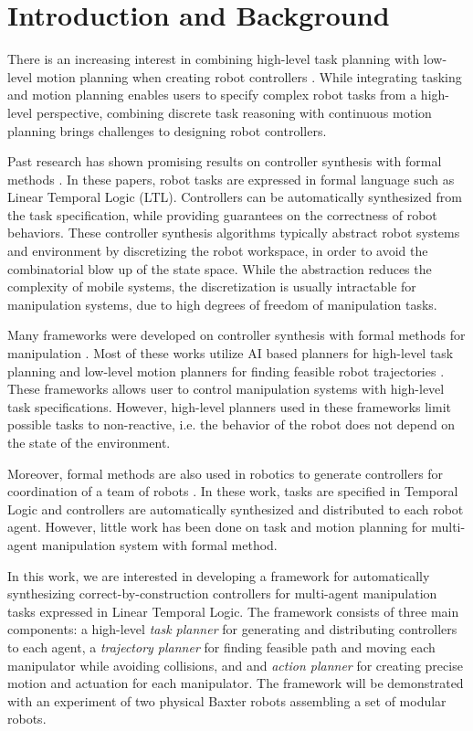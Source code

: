 \section{Introduction and Background}
There is an increasing interest in combining high-level task planning
with low-level motion planning when creating robot controllers \cite{HKG2009,Belta2008,Bhatia2011,Dornhege2009,Erdem2011,Tom2014,Srivastava2014}.
While integrating tasking and motion planning enables users to specify complex robot tasks from a high-level perspective,
combining discrete task reasoning with continuous motion planning brings challenges to designing robot controllers.

Past research has shown promising results on controller synthesis with formal methods \cite{HKG2009,Belta2008,Bhatia2011,Wongpiromsarn,Maly,Vasile}.
In these papers, robot tasks are expressed in formal language such as Linear Temporal Logic (LTL).
Controllers can be automatically synthesized from the task specification,
while providing guarantees on the correctness of robot behaviors.
These controller synthesis algorithms typically abstract robot systems and environment by discretizing the robot workspace,
in order to avoid the combinatorial blow up of the state space.
While the abstraction reduces the complexity of mobile systems,
the discretization is usually intractable for manipulation systems,
due to high degrees of freedom of manipulation tasks.

Many frameworks were developed on controller synthesis with formal methods for manipulation \cite{Dornhege2009,Erdem2011,Tom2014,Srivastava2014,CambonAG09,KaelblingL11,PlakuH10,HeLKV15}.
Most of these works utilize AI based planners for high-level task planning and low-level motion planners for finding feasible robot trajectories \cite{Nau,Hoffmann01}.
These frameworks allows user to control manipulation systems with high-level task specifications.
However, high-level planners used in these frameworks limit possible tasks to non-reactive,
i.e. the behavior of the robot does not depend on the state of the environment.

Moreover, formal methods are also used in robotics to generate controllers for coordination of a team of robots \cite{ChenDSB12,KaramanF08,GuoTD14,VasileB14}.
In these work, tasks are specified in Temporal Logic and controllers are automatically synthesized and distributed to each robot agent. 
However, little work has been done on task and motion planning for multi-agent manipulation system with formal method.

In this work, we are interested in developing a framework for automatically synthesizing correct-by-construction controllers
for multi-agent manipulation tasks expressed in Linear Temporal Logic. The framework consists of three main components:
a high-level {\it task planner} for generating and distributing controllers to each agent,
a {\it trajectory planner} for finding feasible path and moving each manipulator while avoiding collisions,
and and {\it action planner} for creating precise motion and actuation for each manipulator.
The framework will be demonstrated with an experiment of two physical Baxter robots assembling a set of modular robots. 

